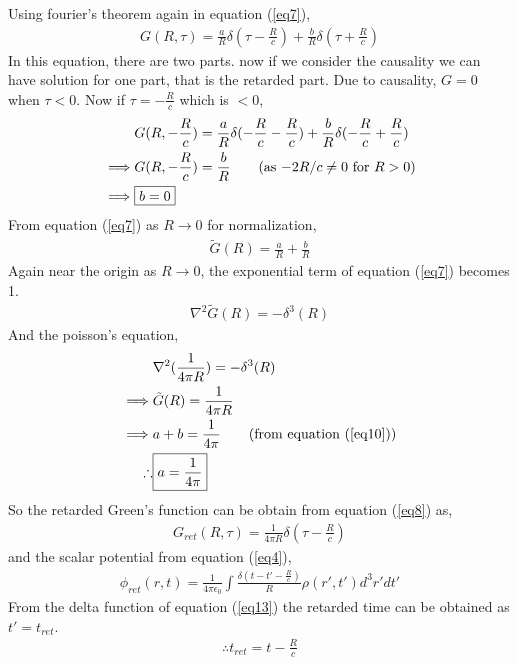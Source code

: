 \documentclass[11pt,a4paper]{article}
\begin{document}
Using fourier's theorem again in equation (\ref{eq7}),
\begin{align}
    G(R, \tau) = \frac{a}{R} \delta(\tau - \frac{R}{c}) + \frac{b}{R} \delta(\tau + \frac{R}{c}) \label{eq8}
\end{align}
In this equation, there are two parts. now if we consider the causality we can have solution for one part, that is the retarded part. 
Due to causality, $G=0$ when $\tau<0$. 
 Now if $\tau = -\frac{R}{c}$ which is $<0$,
\begin{align}
     & G(R, -\frac{R}{c}) = \frac{a}{R}\delta(-\frac{R}{c}-\frac{R}{c}) + \frac{b}{R}\delta (-\frac{R}{c}+\frac{R}{c}) \notag \\
    \implies & G(R, -\frac{R}{c}) = \frac{b}{R} \tag{as $-2R/c \neq 0$ for $R>0$} \\
    \implies & \boxed{b = 0} \label{eq9}
\end{align}
From equation (\ref{eq7}) as $R\rightarrow 0$ for normalization,
\begin{align}
    \tilde{G}(R) = \frac{a}{R} + \frac{b}{R} \label{eq10}
\end{align}
Again near the origin as $R\rightarrow 0$, the exponential term of equation (\ref{eq7}) becomes 1.
\begin{align*}
     \nabla^2\tilde{G}(R) = -\delta^3(R)
\end{align*}
And the poisson's equation,
\begin{align} 
     & \nabla^2(\frac{1}{4\pi R}) = -\delta^3(R) \notag \\
     \implies & \tilde{G}(R) = \frac{1}{4\pi R} \notag \\
     \implies & a + b = \frac{1}{4\pi} \tag{from equation (\ref{eq10})} \\
     \therefore & \boxed{a = \frac{1}{4\pi}}
\end{align}
So the retarded Green's function can be obtain from equation (\ref{eq8}) as,
\begin{align}
    G_{ret}(R, \tau) = \frac{1}{4\pi R} \delta (\tau - \frac{R}{c}) \label{eq12}
\end{align}
and the scalar potential from equation (\ref{eq4}),
\begin{align}
    \phi_{ret}(r,t) = \frac{1}{4\pi \epsilon_0} \int \frac{\delta (t - t' -\frac{R}{c})}{R} \rho (r',t') d^3r'dt' \label{eq13}
\end{align}
From the delta function of equation (\ref{eq13}) the retarded time can be obtained as $t' = t_{ret}$.
\begin{align}
    \therefore \boxed{t_{ret} = t - \frac{R}{c}} \label{eq14}
\end{align}
\end{document}
